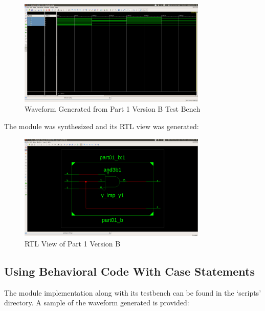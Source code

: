 \documentclass[paper=usletter, fontsize=12pt]{article}
\begin{document}
        \begin{figure}[ht]
            \begin{center}
                \includegraphics[width=0.8\textwidth]{version_b_wav.png}
                \caption{Waveform Generated from Part 1 Version B Test Bench} \label{fig:b_wav}
            \end{center}
        \end{figure}

        The module was synthesized and its RTL view was generated:
        \begin{figure}[ht]
            \begin{center}
                \includegraphics[width=0.8\textwidth]{version_b.png}
                \caption{RTL View of Part 1 Version B} \label{fig:b_rtl}
            \end{center}
        \end{figure}


        \subsection{Using Behavioral Code With Case Statements}
        The module implementation along with its testbench can be found in the `scripts' directory. A sample of the waveform generated is provided:
\end{document}
